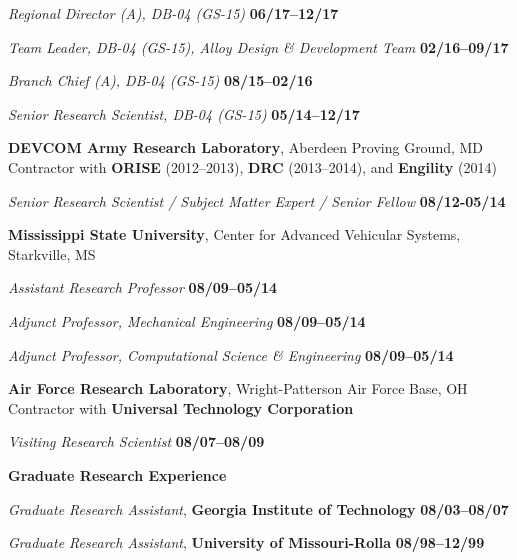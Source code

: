\begin{list1}
\vspace*{.15in}
\item[] {\em Regional Director (A), DB-04 (GS-15)} \hfill    {\bf {06/17--12/17}} 
\item[] {\em Team Leader, DB-04 (GS-15), Alloy Design \& Development Team} \hfill    {\bf {02/16--09/17}}
\item[] {\em Branch Chief (A), DB-04 (GS-15)} \hfill    {\bf {08/15--02/16}} 
\item[] {\em Senior Research Scientist, DB-04 (GS-15)} \hfill    {\bf {05/14--12/17}}
\end{list1}

{\bf DEVCOM Army Research Laboratory}, Aberdeen Proving Ground, MD \\
Contractor with {\bf ORISE} (2012--2013), {\bf DRC} (2013--2014), and {\bf Engility} (2014) \\
\vspace*{-.1in}
\begin{list1}
\item[] {\em Senior Research Scientist / Subject Matter Expert / Senior Fellow} \hfill    {\bf {08/12-05/14}}
\end{list1}

{\bf Mississippi State University}, 
Center for Advanced Vehicular Systems, Starkville, MS \\
\vspace*{-.1in}
\begin{list1}
\item[] {\em Assistant Research Professor} \hfill  {\bf {08/09--05/14}}
\item[] {\em Adjunct Professor, Mechanical Engineering} \hfill  {\bf {08/09--05/14}}
\item[] {\em Adjunct Professor, Computational Science \& Engineering} \hfill  {\bf {08/09--05/14}}
\end{list1}

{\bf Air Force Research Laboratory}, 
Wright-Patterson Air Force Base, OH \\ 
Contractor with {\bf Universal Technology Corporation} \\
\vspace*{-.1in}
\begin{list1}
\item[] {\em Visiting Research Scientist} \hfill    {\bf {08/07--08/09}}
\end{list1}

{\bf Graduate Research Experience} \\
\vspace*{-.1in}
\begin{list1}
\item[] {\em Graduate Research Assistant}, {\bf Georgia Institute of Technology} \hfill {\bf 08/03--08/07}
\item[] {\em Graduate Research Assistant}, {\bf University of Missouri-Rolla} \hfill {\bf 08/98--12/99}
\end{list1}


